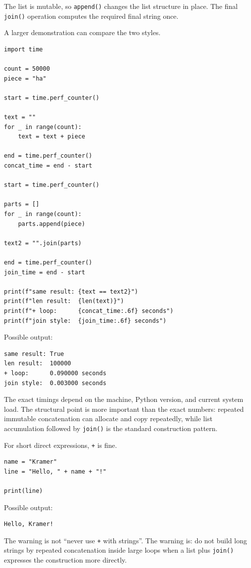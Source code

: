 The list is mutable, so \texttt{append()} changes the list structure in place. The final \texttt{join()} operation computes the required final string once.

A larger demonstration can compare the two styles.

\begin{verbatim}
import time

count = 50000
piece = "ha"

start = time.perf_counter()

text = ""
for _ in range(count):
    text = text + piece

end = time.perf_counter()
concat_time = end - start

start = time.perf_counter()

parts = []
for _ in range(count):
    parts.append(piece)

text2 = "".join(parts)

end = time.perf_counter()
join_time = end - start

print(f"same result: {text == text2}")
print(f"len result:  {len(text)}")
print(f"+ loop:      {concat_time:.6f} seconds")
print(f"join style:  {join_time:.6f} seconds")
\end{verbatim}

Possible output:

\begin{verbatim}
same result: True
len result:  100000
+ loop:      0.090000 seconds
join style:  0.003000 seconds
\end{verbatim}

The exact timings depend on the machine, Python version, and current system load. The structural point is more important than the exact numbers: repeated immutable concatenation can allocate and copy repeatedly, while list accumulation followed by \texttt{join()} is the standard construction pattern.

For short direct expressions, \texttt{+} is fine.

\begin{verbatim}
name = "Kramer"
line = "Hello, " + name + "!"

print(line)
\end{verbatim}

Possible output:

\begin{verbatim}
Hello, Kramer!
\end{verbatim}

The warning is not ``never use \texttt{+} with strings''. The warning is: do not build long strings by repeated concatenation inside large loops when a list plus \texttt{join()} expresses the construction more directly.

